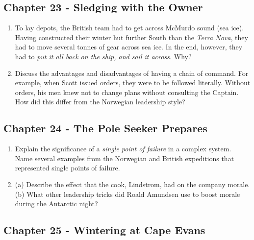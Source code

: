 \documentclass[10pt]{article}
\begin{document}
\subsection{Chapter 23 - Sledging with the Owner}

\begin{enumerate}
\item To lay depots, the British team had to get across McMurdo sound (sea ice).  Having constructed their winter hut further South than the \textit{Terra Nova}, they had to move several tonnes of gear across sea ice.  In the end, however, they had to \textit{put it all back on the ship, and sail it across.}  Why? \\ \vspace{1.5cm}
\item Discuss the advantages and disadvantages of having a chain of command.  For example, when Scott issued orders, they were to be followed literally.  Without orders, his men knew not to change plans without consulting the Captain.  How did this differ from the Norwegian leadership style? \\ \vspace{1.5cm}
\end{enumerate}

\subsection{Chapter 24 - The Pole Seeker Prepares}

\begin{enumerate}
\item Explain the significance of a \textit{single point of failure} in a complex system.  Name several examples from the Norwegian and British expeditions that represented single points of failure. \\ \vspace{1.5cm}
\item (a) Describe the effect that the cook, Lindstrom, had on the company morale.  (b) What other leadership tricks did Roald Amundsen use to boost morale during the Antarctic night? \\ \vspace{1.5cm}
\end{enumerate}

\subsection{Chapter 25 - Wintering at Cape Evans}
\end{document}
